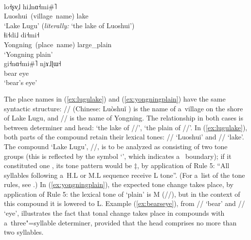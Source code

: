 \begin{exe}
  \ex
  \begin{xlist}
    \ex \label{ex:lugulake}
    \\
	\gll lo˧ʂv̩˩		hi˩nɑ˧mi\#˥\\
	Luoshui~(village~name)		lake\\
    \glt ‘Lake Lugu’ (\textit{literally:} ‘the lake of Luoshui’)
    \ex \label{ex:yongningplain}
    \\
	\gll ɬi˧di˩		di˧mi˧\\
		Yongning~(place~name)		large\_plain\\
    \glt ‘Yongning plain’
    \ex \label{ex:bearseye}
    \\
	\gll gi˧nɑ˧mi\#˥		njɤ˩ɭɯ˧\\
	bear		eye\\
    \glt ‘bear’s eye’
  \end{xlist}
\end{exe}

The place names in (\ref{ex:lugulake}) and (\ref{ex:yongningplain}) have the same syntactic structure: // (Chinese: Luòshuǐ ) is the name of a~village on the shore of Lake Lugu, and // is the name of Yongning. The relationship in both cases is between determiner and
head: ‘the lake of //’, ‘the plain of //’. In (\ref{ex:lugulake}), both parts of the
compound retain their lexical tones: // ‘Luoshui’ and // ‘lake’. The
compound ‘Lake Lugu’, //, is to be analyzed as consisting of two tone
groups (this is reflected by the symbol ‘\ipa{|}’, which indicates a~ boundary); if it constituted one , its tone pattern would be $\ddagger${\kern2pt},
by application of Rule 5: “All syllables following a~H.L or M.L sequence receive L tone”. (For
a~list of the tone rules, see .) In (\ref{ex:yongningplain}), the expected
tone change takes place, by application of Rule 5: the lexical tone of ‘plain’ is M
(//), but in the context of this compound it is lowered to L. Example (\ref{ex:bearseye}), from //
‘bear’ and // ‘eye’, illustrates the fact that tonal change takes place in compounds
with a~three"=syllable determiner, provided that the head comprises no more than two syllables.

